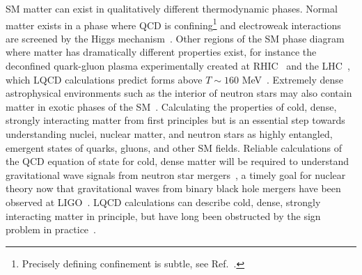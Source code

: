 SM matter can exist in qualitatively different thermodynamic phases.
Normal matter exists in a phase
where QCD is confining\footnote{Precisely defining confinement is subtle, see Ref.~\cite{Greensite:2003bk}.} and
electroweak interactions are screened by the Higgs mechanism~\cite{Higgs:1964ia,Higgs:1964pj,Higgs:1966ev,Englert:1964et}.
Other regions of the SM phase diagram
where matter has dramatically different properties exist,
for instance the deconfined quark-gluon plasma experimentally created at RHIC~\cite{Arsene:2004fa,Back:2004je,Adcox:2004mh} and the LHC~\cite{Aamodt:2008zz}, 
which LQCD calculations predict forms above $T\sim 160$ MeV~\cite{McLerran:1980pk,Kuti:1980gh,Engels:1980ty,Kajantie:1981wh,Kogut:1982rt,Pisarski:1983ms,Celik:1983wz,Aoki:2006we,Borsanyi:2010bp,Bazavov:2011nk,Bhattacharya:2014ara}.
Extremely dense astrophysical environments such as the interior of neutron stars may also contain matter in exotic phases of the SM~\cite{Collins:1974ky,Alford:1998mk,Alford:1997zt,Rapp:1997zu,Schafer:1998ef}.
Calculating the properties of cold, dense, strongly interacting matter from first principles
but is an essential step towards understanding nuclei, nuclear matter, and neutron stars
as highly entangled, emergent states
of quarks, gluons, and other SM fields.
Reliable calculations of the QCD equation of state for cold, dense matter will be required to understand gravitational wave signals from neutron star mergers~\cite{Flanagan:2007ix,Damour:2012yf}, 
a timely goal for nuclear theory now that gravitational waves from binary black hole mergers have been observed at LIGO~\cite{Abbott:2016blz}.
LQCD calculations can describe cold, dense, strongly interacting matter in principle,
but have long been obstructed by the sign problem in practice~\cite{Gibbs:1986ut}.

